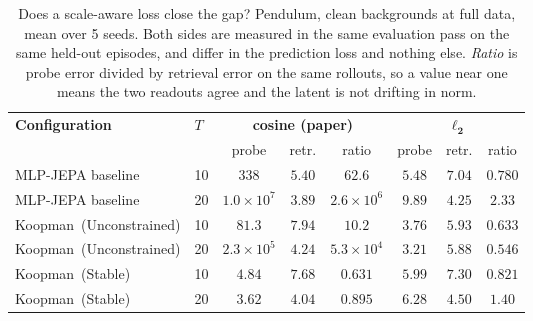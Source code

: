 \begin{table}[t]
\caption{Does a scale-aware loss close the gap? Pendulum, clean backgrounds at full data, mean over 5 seeds. Both sides are measured in the same evaluation pass on the same held-out episodes, and differ in the prediction loss and nothing else. \emph{Ratio} is probe error divided by retrieval error on the same rollouts, so a value near one means the two readouts agree and the latent is not drifting in norm.}
\label{tab:l2_ablation}
\centering
\small
\begin{tabular}{@{}llcccccc@{}}
\toprule
\textbf{Configuration} & $T$ & \multicolumn{3}{c}{\textbf{cosine (paper)}} & \multicolumn{3}{c}{$\boldsymbol{\ell_2}$} \\
 & & probe & retr. & ratio & probe & retr. & ratio \\
\midrule
MLP-JEPA baseline & 10 & $338$ & $5.40$ & $62.6$ & $5.48$ & $7.04$ & $0.780$ \\
MLP-JEPA baseline & 20 & $1.0{\times}10^{7}$ & $3.89$ & $2.6{\times}10^{6}$ & $9.89$ & $4.25$ & $2.33$ \\
Koopman~(Unconstrained) & 10 & $81.3$ & $7.94$ & $10.2$ & $3.76$ & $5.93$ & $0.633$ \\
Koopman~(Unconstrained) & 20 & $2.3{\times}10^{5}$ & $4.24$ & $5.3{\times}10^{4}$ & $3.21$ & $5.88$ & $0.546$ \\
Koopman~(Stable) & 10 & $4.84$ & $7.68$ & $0.631$ & $5.99$ & $7.30$ & $0.821$ \\
Koopman~(Stable) & 20 & $3.62$ & $4.04$ & $0.895$ & $6.28$ & $4.50$ & $1.40$ \\
\bottomrule
\end{tabular}
\end{table}

